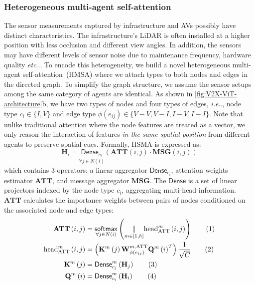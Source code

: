 \documentclass[runningheads]{llncs}
\makeatletter
\newcommand\numberthis{\addtocounter{equation}{1}\tag{\theequation}}
\DeclareRobustCommand\onedot{\futurelet\@let@token\@onedot}
\def\@onedot{\ifx\@let@token.\else.\null\fi\xspace}
\def\ie{\emph{i.e}\onedot} \def\Ie{\emph{I.e}\onedot}
\def\etc{\emph{etc}\onedot} \def\vs{\emph{vs}\onedot}
\makeatother
\begin{document}
\subsubsection{Heterogeneous multi-agent self-attention}
\label{sssec:hmasa}
The sensor measurements captured by infrastructure and AVs possibly have distinct characteristics. The infrastructure's LiDAR is often installed at a higher position with less occlusion and different view angles. In addition, the sensors may have different levels of sensor noise due to maintenance frequency, hardware quality \etc. To encode this heterogeneity, we build a novel heterogeneous multi-agent self-attention~({HMSA}) where we attach types to both nodes and edges in the directed graph. To simplify the graph structure, we assume the sensor setups among the same category of agents are identical. 
As shown in \cref{fig:V2X-ViT-architecture}b, we have two types of nodes and four types of edges, \ie, node type $c_{i}\in\{I,V\}$ and edge type $\phi\left(e_{ij}\right)\in\{V\!-\!V,V\!-\!I,I\!-\!V,I\!-\!I\}$. Note that unlike traditional attention where the node features are treated as a vector, we only reason the interaction of features \textit{in the same spatial position} from different agents to preserve spatial cues.
Formally, HSMA is expressed as:
\begin{equation}
\mathbf{H}_i=\underset{\forall j\in N\left(i\right)}{\mathsf{Dense}_{c_i}}\left(\mathbf{ATT}\left(i,j\right)\cdot\mathbf{MSG}\left(i,j\right) \right)
\label{eq:hmsa}
\end{equation}
which contains 3 operators: a linear aggregator $\mathsf{Dense}_{c_i}$, attention weights estimator $\mathbf{ATT}$, and message aggregator $\mathbf{MSG}$. The $\mathsf{Dense}$ is a set of linear projectors indexed by the node type $c_i$, aggregating multi-head information. $\mathbf{ATT}$ calculates the importance weights between pairs of nodes conditioned on the associated node and edge types:
\vspace{-3mm}
\begin{align*}
    {\mathbf{ATT}}\left(i,j\right)&=\underset{\forall j\in N\left(i \right)}{\mathsf{softmax}}\left(\underset{m\in[1,h]}{\|}\text{head}^m_{\mathrm{ATT}}\left(i,j\right) \right)\numberthis \label{1}\\
    \text{head}^m_{\mathrm{ATT}}\left(i,j\right)&=\left(\mathbf{K}^m\left(j\right)\mathbf{W}_{\phi\left(e_{ij}\right)}^{m,\mathrm{ATT}}\mathbf{Q}^m\left(i\right)^T \right) \frac{1}{\sqrt{C}}\numberthis \label{2}\\
    \mathbf{K}^m\left(j\right)&=\mathsf{Dense}^{m}_{c_j}\left({\mathbf{H}_j}\right) \numberthis \label{3}\\
    \mathbf{Q}^m\left(i\right)&=\mathsf{Dense}^{m}_{c_i}\left({\mathbf{H}_i}\right) \numberthis \label{4}
\end{align*}
\end{document}
